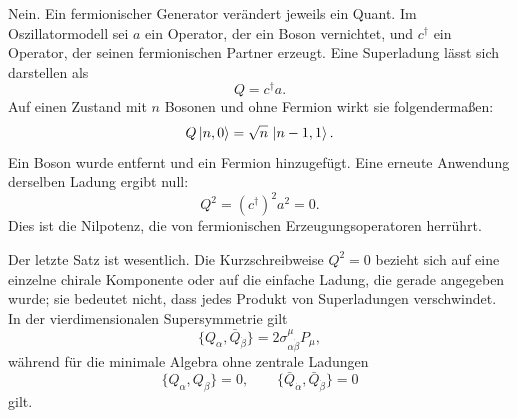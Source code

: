 Nein. Ein fermionischer Generator verändert jeweils ein Quant. Im Oszillatormodell sei \(a\) ein Operator, der ein Boson vernichtet, und \(c^\dagger\) ein Operator, der seinen fermionischen Partner erzeugt. Eine Superladung lässt sich darstellen als
\begin{equation}
Q=c^\dagger a.
\end{equation}
Auf einen Zustand mit \(n\) Bosonen und ohne Fermion wirkt sie folgendermaßen:
\begin{equation}
Q\left\lvert n,0\right\rangle
=\sqrt n\,\left\lvert n-1,1\right\rangle.
\end{equation}
Ein Boson wurde entfernt und ein Fermion hinzugefügt. Eine erneute Anwendung derselben Ladung ergibt null:
\begin{equation}
Q^2=(c^\dagger)^2a^2=0.
\end{equation}
Dies ist die Nilpotenz, die von fermionischen Erzeugungsoperatoren herrührt.

\begin{classroomqa}
\end{classroomqa}

Der letzte Satz ist wesentlich. Die Kurzschreibweise \(Q^2=0\) bezieht sich auf eine einzelne chirale Komponente oder auf die einfache Ladung, die gerade angegeben wurde; sie bedeutet nicht, dass jedes Produkt von Superladungen verschwindet. In der vierdimensionalen Supersymmetrie gilt
\begin{equation}
\{Q_\alpha,\bar Q_{\dot\beta}\}
=2\sigma^\mu_{\alpha\dot\beta}P_\mu,
\end{equation}
während für die minimale Algebra ohne zentrale Ladungen
\begin{equation}
\{Q_\alpha,Q_\beta\}=0,
\qquad
\{\bar Q_{\dot\alpha},\bar Q_{\dot\beta}\}=0
\end{equation}
gilt.

